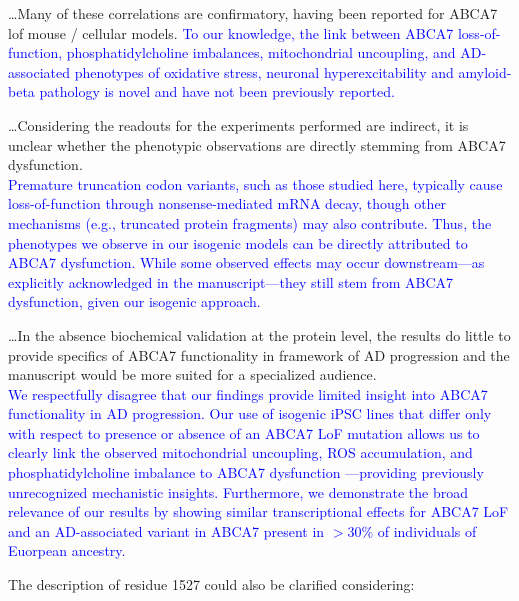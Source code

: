 \dots Many of these correlations are confirmatory, having been reported for ABCA7 lof mouse / cellular models. 
\textcolor{blue}{To our knowledge, the link between ABCA7 loss-of-function, phosphatidylcholine imbalances, mitochondrial uncoupling, and AD-associated phenotypes of oxidative stress, neuronal hyperexcitability and amyloid-beta pathology is novel and have not been previously reported.}

\dots Considering the readouts for the experiments performed are indirect, it is unclear whether the phenotypic observations are directly stemming from ABCA7 dysfunction.\\ 
\textcolor{blue}{Premature truncation codon variants, such as those studied here, typically cause loss-of-function through nonsense-mediated mRNA decay, though other mechanisms (e.g., truncated protein fragments) may also contribute. Thus, the phenotypes we observe in our isogenic models can be directly attributed to ABCA7 dysfunction. While some observed effects may occur downstream—as explicitly acknowledged in the manuscript—they still stem from ABCA7 dysfunction, given our isogenic approach.}

\dots In the absence biochemical validation at the protein level, the results do little to provide specifics of ABCA7 functionality in framework of AD progression and the manuscript would be more suited for a specialized audience.\\ 
\textcolor{blue}{We respectfully disagree that our findings provide limited insight into ABCA7 functionality in AD progression. Our use of isogenic iPSC lines that differ only with respect to presence or absence of an ABCA7 LoF mutation allows us to clearly link the observed mitochondrial uncoupling, ROS accumulation, and phosphatidylcholine imbalance to ABCA7 dysfunction —providing previously unrecognized mechanistic insights. Furthermore, we demonstrate the broad relevance of our results by showing similar transcriptional effects for ABCA7 LoF and an  AD-associated variant in ABCA7 present in $>30\%$ of individuals of Euorpean ancestry.}

The description of residue 1527 could also be clarified considering:

